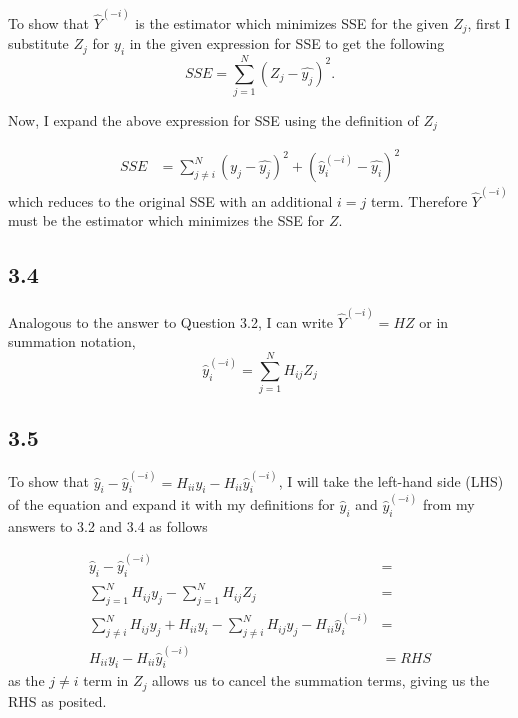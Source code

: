 \documentclass[12pt]{amsart}
\begin{document}
To show that $\hat{Y}^{(-i)}$ is the estimator which minimizes SSE for the given $Z_j$, first I substitute $Z_j$ for $y_i$ in the given expression for SSE to get the following
\begin{equation}
SSE = \sum_{j=1}^N (Z_j - \hat{y_j})^2.
\end{equation} 

Now, I expand the above expression for SSE using the definition of $Z_j$

\begin{equation}
\begin{split}
SSE & = \sum_{j \neq i}^N (y_j - \hat{y_j})^2  + (\hat{y}_i^{(-i)} - \hat{y_i})^2
\end{split}
\end{equation}
which reduces to the original SSE with an additional $i = j$ term.  Therefore $\hat{Y}^{(-i)}$ must be the estimator which minimizes the SSE for $Z$.

\subsection*{3.4}

Analogous to the answer to Question 3.2, I can write $\hat{Y}^{(-i)} = HZ$ or in summation notation,
\begin{equation}
\hat{y}_i^{(-i)} = \sum_{j = 1}^N H_{ij}Z_j
\end{equation}

\subsection*{3.5}

To show that $\hat{y}_i - \hat{y}_i^{(-i)} = H_{ii}y_i - H_{ii}\hat{y}_i^{(-i)} $, I will take the left-hand side (LHS) of the equation and expand it with my definitions for $\hat{y}_i $ and $\hat{y}_i^{(-i)}$ from my answers to 3.2 and 3.4 as follows

\begin{equation}
\begin{split}
\hat{y}_i - \hat{y}_i^{(-i)}  & = \\
\sum_{j = 1}^N H_{ij}y_j - \sum_{j = 1}^N H_{ij}Z_j & = \\
\sum_{j \neq i}^N H_{ij}y_j + H_{ii}y_i - \sum_{j \neq i}^N H_{ij}y_j - H_{ii}\hat{y}_i^{(-i)} & = \\
H_{ii}y_i - H_{ii}\hat{y}_i^{(-i)} & = RHS
\end{split}
\end{equation}
as the $j \neq i$ term in $Z_j$ allows us to cancel the summation terms, giving us the RHS as posited.
\end{document}
